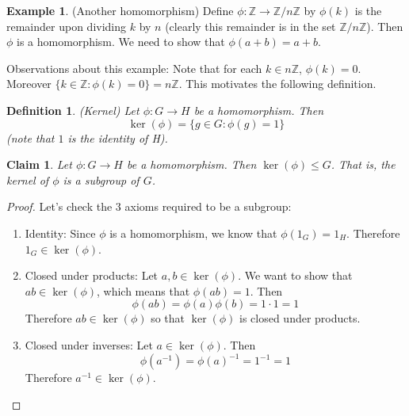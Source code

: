 \documentclass[12pt]{article}
\newtheorem{claim}{Claim}
\newtheorem{definition}{Definition}
\theoremstyle{definition}
\newtheorem{example}{Example}
\theoremstyle{definition}
\begin{document}
\begin{example}(Another homomorphism)
Define $\phi : \mathbb{Z} \to \mathbb{Z} / n \mathbb{Z}$ by $\phi(k)$ is the remainder upon dividing $k$ by $n$ (clearly this remainder is in the set $\mathbb{Z} / n \mathbb{Z}$). Then $\phi$ is a homomorphism. We need to show that $\phi(a + b) = a + b$.  

Observations about this example: Note that for each $k \in n \mathbb{Z}$, $\phi(k) = 0$. Moreover $\{ k \in \mathbb{Z} : \phi(k) = 0 \} = n \mathbb{Z}$. This motivates the following definition.
\end{example}

\begin{definition}(Kernel)
Let $\phi:G \to H$ be a homomorphism. Then
\begin{equation}
	\ker(\phi) = \{g \in G : \phi(g) = 1 \}
\end{equation}
(note that $1$ is the identity of H).
\end{definition}

\begin{claim}
Let $\phi: G \to H$ be a homomorphism. Then $\ker(\phi) \leq G$. That is, the kernel of $\phi$ is a subgroup of $G$.
\end{claim}
\begin{proof}
Let's check the 3 axioms required to be a subgroup:
\begin{enumerate}
	\item Identity: Since $\phi$ is a homomorphism, we know that $\phi(1_G) = 1_H$. Therefore $1_G \in \ker(\phi)$.
	\item Closed under products: Let $a,b \in \ker(\phi)$. We want to show that $ab \in \ker(\phi)$, which means that $\phi(ab) = 1$. Then
	\begin{equation}
		\phi(ab) = \phi(a) \phi(b) = 1 \cdot 1 = 1
	\end{equation}
	Therefore $ab \in \ker(\phi)$ so that $\ker(\phi)$ is closed under products. 
	\item Closed under inverses: Let $a \in \ker(\phi)$. Then
	\begin{equation}
		\phi(a^{-1}) = \phi(a)^{-1} = 1^{-1} = 1
	\end{equation}
	Therefore $a^{-1} \in \ker(\phi)$. 
\end{enumerate}
\end{proof}
\end{document}
